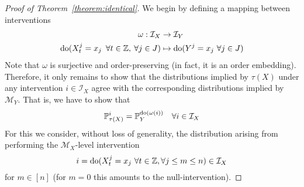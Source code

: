 \begin{proof}[Proof of Theorem~\ref{theorem:identical}]
We begin by defining a mapping between interventions
\begin{align*}
\omega : \mathcal{I}_X &\rightarrow \mathcal{I}_Y \\
\operatorname{do}(X_t^j= x_j \enspace \forall t \in \mathbb{Z}, \: \forall j \in J) & \mapsto \operatorname{do}(Y^j= x_j \ \forall j \in J)
\end{align*}
%
Note that $\omega$ is surjective and order-preserving (in fact, it is an order embedding).
Therefore, it only remains to show that the distributions implied by $\tau(X)$ under any intervention $i\in\mathcal{I}_X$ agree with the corresponding distributions implied by $\mathcal{M}_Y$.
That is, we have to show that
\[ \mathbb{P}_{\tau(X)}^{i} = \mathbb{P}_{Y}^{\operatorname{do}(\omega(i))} \quad \forall i\in\mathcal{I}_X \]
%
For this we consider, without loss of generality, the distribution arising from performing the $\mathcal{M}_X$-level intervention
\[ i = \operatorname{do}(X_t^j=x_j\ \forall t\in\mathbb{Z},\forall j \leq m \leq n) \in \mathcal{I}_X \]
for $m \in [n]$ (for $m=0$ this amounts to the null-intervention).


\end{proof}
